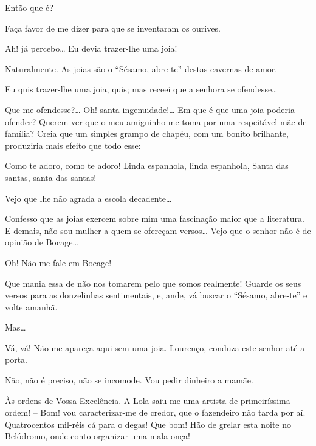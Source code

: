  Então que é?

 Faça favor de me dizer para que se inventaram os ourives.

 Ah! já percebo\ldots{} Eu devia trazer-lhe uma joia!

 Naturalmente. As joias são o “Sésamo, abre-te” destas cavernas de
amor.

 Eu quis trazer-lhe uma joia, quis; mas receei que a senhora se
ofendesse\ldots{}

 Que me ofendesse?\ldots{} Oh! santa ingenuidade!\ldots{} Em que é que uma joia
poderia ofender? Querem ver que o meu amiguinho me toma por uma respeitável
mãe de família? Creia que um simples grampo de chapéu, com um bonito
brilhante, produziria mais efeito que todo esse:

 Como te adoro, como te adoro!
 Linda espanhola, linda espanhola,
 Santa das santas, santa das santas!

 Vejo que lhe não agrada a escola decadente\ldots{}

 Confesso que as joias exercem sobre mim uma fascinação maior que a
literatura. E demais, não sou mulher a quem se ofereçam versos\ldots{} Vejo que
o senhor não é de opinião de Bocage\ldots{}

 Oh! Não me fale em Bocage!

 Que mania essa de não nos tomarem pelo que somos realmente! Guarde
os seus versos para as donzelinhas sentimentais, e, ande, vá buscar o “Sésamo,
abre-te” e volte amanhã. 

 Mas\ldots{}

 Vá, vá! Não me apareça aqui sem uma joia.  Lourenço,
conduza este senhor até a porta. 

 Não, não é preciso, não se incomode.  Vou pedir
dinheiro a mamãe. 


 Às ordens de Vossa Excelência.  A Lola saiu-me uma
artista de primeiríssima ordem! -- Bom! vou caracterizar-me de credor, que o fazendeiro
não tarda por aí. Quatrocentos mil-réis cá para o degas! Que bom! Hão de grelar
esta noite no Belódromo, onde conto organizar uma mala onça! 

